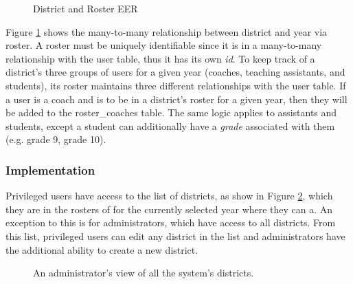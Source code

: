 \begin{figure}[h!]
	\centering
	\caption{District and Roster EER}
	\label{fig:er-district}
\end{figure}

Figure \ref{fig:er-district} shows the many-to-many relationship between district and year via roster. A roster must be uniquely identifiable since it is in a many-to-many relationship with the user table, thus it has its own \emph{id}. To keep track of a district's three groups of users for a given year (coaches, teaching assistants, and students), its roster maintains three different relationships with the user table. If a user is a coach and is to be in a district's roster for a given year, then they will be added to the roster\_coaches table. The same logic applies to assistants and students, except a student can additionally have a \emph{grade} associated with them (e.g. grade 9, grade 10).

\subsubsection{Implementation}
Privileged users have access to the list of districts, as show in Figure \ref{fig:screens-district-list}, which they are in the rosters of for the currently selected year where they can a. An exception to this is for administrators, which have access to all districts. From this list, privileged users can edit any district in the list and administrators have the additional ability to create a new district.

\begin{figure}[h!]
	\centering
	\caption{An administrator's view of all the system's districts.}
	\label{fig:screens-district-list}
\end{figure}


